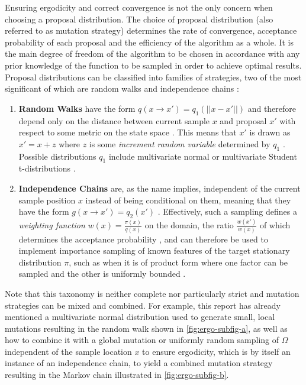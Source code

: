 \documentclass[oneside, a4paper]{article}
\newcommand\abss[1]{\left|\left|#1\right|\right|}
\newcommand\br[1]{\left(#1\right)}
\begin{document}
Ensuring ergodicity and correct convergence is not the only concern when choosing a proposal distribution. The choice of proposal distribution (also referred to as mutation strategy) determines the rate of convergence, acceptance probability of each proposal and the efficiency of the algorithm as a whole. It is the main degree of freedom of the algorithm to be chosen in accordance with any prior knowledge of the function to be sampled in order to achieve optimal results. Proposal distributions can be classified into families of strategies, two of the most significant of which are random walks and independence chains \autocite{understanding-mh-chib-greenberg}:
\begin{enumerate}
  \item \textbf{Random Walks} have the form $q(x\to x') = q_1\br{\abss{x - x'}}$ and therefore depend only on the distance between current sample $x$ and proposal $x'$ with respect to some metric on the state space \autocite{transience}. This means that $x'$ is drawn as $x' = x + z$ where $z$ is some \textit{increment random variable} determined by $q_1$ \autocite{understanding-mh-chib-greenberg}. Possible distributions $q_1$ include multivariate normal or multivariate Student t-distributions \autocite{bayesian-gibbs-mcmc}.
  \item \textbf{Independence Chains} are, as the name implies, independent of the current sample position $x$ instead of being conditional on them, meaning that they have the form $g(x\to x') = q_2(x')$ \autocite{understanding-mh-chib-greenberg}. Effectively, such a sampling defines a \textit{weighting function} $w(x) = \frac{\pi(x)}{q(x)}$ on the domain, the ratio $\frac{w(x')}{w(x)}$ of which determines the acceptance probability \autocite{bayesian-gibbs-mcmc}, and can therefore be used to implement importance sampling of known features of the target stationary distribution $\pi$, such as when it is of product form where one factor can be sampled and the other is uniformly bounded \autocite{understanding-mh-chib-greenberg}. 
\end{enumerate}

Note that this taxonomy is neither complete nor particularly strict and mutation strategies can be mixed and combined. For example, this report has already mentioned a multivariate normal distribution used to generate small, local mutations resulting in the random walk shown in \autoref{fig:ergo-subfig-a}, as well as how to combine it with a global mutation or uniformly random sampling of $\Omega$ independent of the sample location $x$ to ensure ergodicity, which is by itself an instance of an independence chain, to yield a combined mutation strategy resulting in the Markov chain illustrated in \autoref{fig:ergo-subfig-b}.\\
\end{document}
